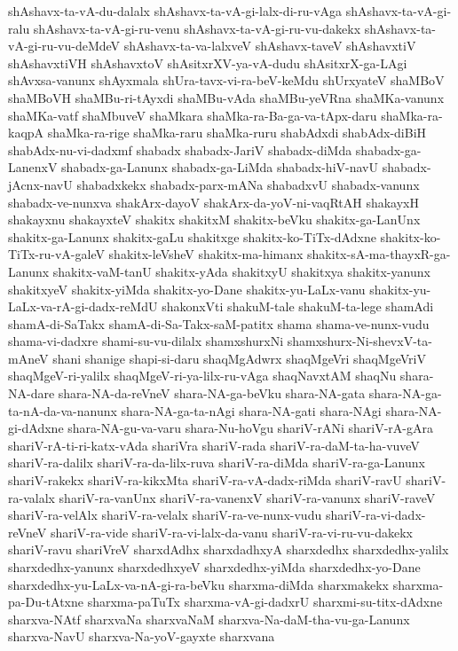 {shAshavx-ta-vA-du-dalalx
shAshavx-ta-vA-gi-lalx-di-ru-vAga
shAshavx-ta-vA-gi-ralu
shAshavx-ta-vA-gi-ru-venu
shAshavx-ta-vA-gi-ru-vu-dakekx
shAshavx-ta-vA-gi-ru-vu-deMdeV
shAshavx-ta-va-lalxveV
shAshavx-taveV
shAshavxtiV
shAshavxtiVH
shAshavxtoV
shAsitxrXV-ya-vA-dudu
shAsitxrX-ga-LAgi
shAvxsa-vanunx
shAyxmala
shUra-tavx-vi-ra-beV-keMdu
shUrxyateV
shaMBoV
shaMBoVH
shaMBu-ri-tAyxdi
shaMBu-vAda
shaMBu-yeVRna
shaMKa-vanunx
shaMKa-vatf
shaMbuveV
shaMkara
shaMka-ra-Ba-ga-va-tApx-daru
shaMka-ra-kaqpA
shaMka-ra-rige
shaMka-raru
shaMka-ruru
shabAdxdi
shabAdx-diBiH
shabAdx-nu-vi-dadxmf
shabadx
shabadx-JariV
shabadx-diMda
shabadx-ga-LanenxV
shabadx-ga-Lanunx
shabadx-ga-LiMda
shabadx-hiV-navU
shabadx-jAcnx-navU
shabadxkekx
shabadx-parx-mANa
shabadxvU
shabadx-vanunx
shabadx-ve-nunxva
shakArx-dayoV
shakArx-da-yoV-ni-vaqRtAH
shakayxH
shakayxnu
shakayxteV
shakitx
shakitxM
shakitx-beVku
shakitx-ga-LanUnx
shakitx-ga-Lanunx
shakitx-gaLu
shakitxge
shakitx-ko-TiTx-dAdxne
shakitx-ko-TiTx-ru-vA-galeV
shakitx-leVsheV
shakitx-ma-himanx
shakitx-sA-ma-thayxR-ga-Lanunx
shakitx-vaM-tanU
shakitx-yAda
shakitxyU
shakitxya
shakitx-yanunx
shakitxyeV
shakitx-yiMda
shakitx-yo-Dane
shakitx-yu-LaLx-vanu
shakitx-yu-LaLx-va-rA-gi-dadx-reMdU
shakonxVti
shakuM-tale
shakuM-ta-lege
shamAdi
shamA-di-SaTakx
shamA-di-Sa-Takx-saM-patitx
shama
shama-ve-nunx-vudu
shama-vi-dadxre
shami-su-vu-dilalx
shamxshurxNi
shamxshurx-Ni-shevxV-ta-mAneV
shani
shanige
shapi-si-daru
shaqMgAdwrx
shaqMgeVri
shaqMgeVriV
shaqMgeV-ri-yalilx
shaqMgeV-ri-ya-lilx-ru-vAga
shaqNavxtAM
shaqNu
shara-NA-dare
shara-NA-da-reVneV
shara-NA-ga-beVku
shara-NA-gata
shara-NA-ga-ta-nA-da-va-nanunx
shara-NA-ga-ta-nAgi
shara-NA-gati
shara-NAgi
shara-NA-gi-dAdxne
shara-NA-gu-va-varu
shara-Nu-hoVgu
shariV-rANi
shariV-rA-gAra
shariV-rA-ti-ri-katx-vAda
shariVra
shariV-rada
shariV-ra-daM-ta-ha-vuveV
shariV-ra-dalilx
shariV-ra-da-lilx-ruva
shariV-ra-diMda
shariV-ra-ga-Lanunx
shariV-rakekx
shariV-ra-kikxMta
shariV-ra-vA-dadx-riMda
shariV-ravU
shariV-ra-valalx
shariV-ra-vanUnx
shariV-ra-vanenxV
shariV-ra-vanunx
shariV-raveV
shariV-ra-velAlx
shariV-ra-velalx
shariV-ra-ve-nunx-vudu
shariV-ra-vi-dadx-reVneV
shariV-ra-vide
shariV-ra-vi-lalx-da-vanu
shariV-ra-vi-ru-vu-dakekx
shariV-ravu
shariVreV
sharxdAdhx
sharxdadhxyA
sharxdedhx
sharxdedhx-yalilx
sharxdedhx-yanunx
sharxdedhxyeV
sharxdedhx-yiMda
sharxdedhx-yo-Dane
sharxdedhx-yu-LaLx-va-nA-gi-ra-beVku
sharxma-diMda
sharxmakekx
sharxma-pa-Du-tAtxne
sharxma-paTuTx
sharxma-vA-gi-dadxrU
sharxmi-su-titx-dAdxne
sharxva-NAtf
sharxvaNa
sharxvaNaM
sharxva-Na-daM-tha-vu-ga-Lanunx
sharxva-NavU
sharxva-Na-yoV-gayxte
sharxvana
}
